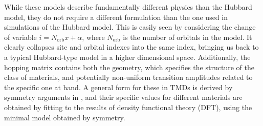 While these models describe fundamentally different physics than the Hubbard model, they do not require a different formulation than the one used in simulations of the Hubbard model.
This is easily seen by considering the change of variable $i = N_{\text{orb}} x + \alpha$, where $N_{\text{orb}}$ is the number of orbitals in the model.
It clearly collapses site and orbital indexes into the same index, bringing us back to a typical Hubbard-type model in a higher dimensional space.
Additionally, the hopping matrix contains both the geometry, which specifies the  structure of the class of materials, and potentially non-uniform transition amplitudes related to the specific one at hand.
A general form for these in \acp{TMD} is derived by symmetry arguments in \cite{liu_three-band_2013}, and their specific values for different materials are obtained by fitting to the results of  density functional theory (DFT), using the minimal model obtained by symmetry.
